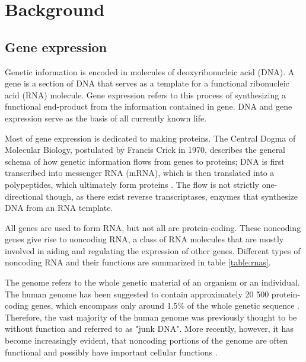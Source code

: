 


\section{Background}\label{background}











\subsection{Gene expression}\label{gene-expression}

Genetic information is encoded in molecules of deoxyribonucleic acid (DNA). A
gene is a section of DNA that serves as a template for a functional
ribonucleic acid (RNA) molecule. Gene expression refers to this process of
synthesizing a functional end-product from the information contained in gene.
DNA and gene expression serve as the basis of all currently known life.

Most of gene expression is dedicated to making proteins. The Central Dogma of
Molecular Biology, postulated by Francis Crick in 1970, describes the general
schema of how genetic information flows from genes to proteins; DNA is first
transcribed into messenger RNA (mRNA), which is then translated into a polypeptides,
which ultimately form proteins \citep{Crick1970}. The flow is not strictly
one-directional though, as there exist reverse transcriptases, enzymes that
synthesize DNA from an RNA template.

All genes are used to form RNA, but not all are protein-coding. These
noncoding genes give rise to noncoding RNA, a class of RNA molecules that
are mostly involved in aiding and regulating the expression of other genes.
Different types of noncoding RNA and their functions are summarized in
table \ref{table:rnas}.

The genome refers to the whole genetic material of an organism or an individual.
The human genome has been suggested to contain approximately 20 500 protein-coding
genes, which encompass only around 1.5\% of the whole genetic sequence
\citep{Clamp2007}. Therefore, the vast majority of the human genome was previously thought
to be without function and referred to as "junk DNA". More recently, however,
it has become increasingly evident, that noncoding portions of the genome
are often functional and possibly have important cellular functions \citep{ENCODE}.




